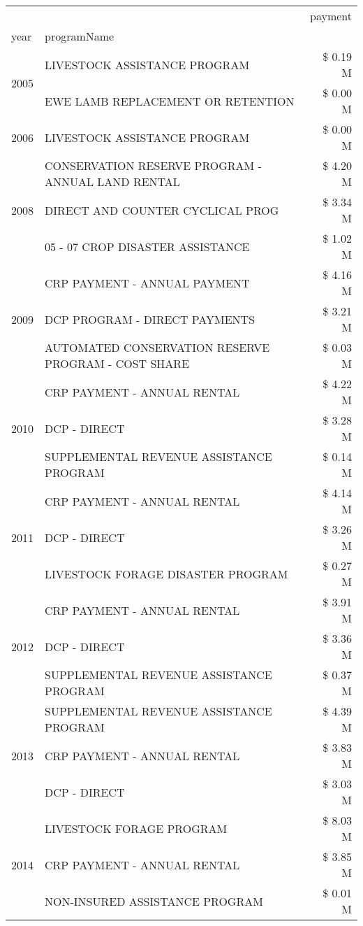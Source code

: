 \begin{tabular}{llr}
\toprule
 &  & payment \\
year & programName &  \\
\midrule
\multirow[t]{2}{*}{2005} & LIVESTOCK ASSISTANCE PROGRAM & \$ 0.19 M \\
 & EWE LAMB REPLACEMENT OR RETENTION & \$ 0.00 M \\
\cline{1-3}
2006 & LIVESTOCK ASSISTANCE PROGRAM & \$ 0.00 M \\
\cline{1-3}
\multirow[t]{3}{*}{2008} & CONSERVATION RESERVE PROGRAM - ANNUAL LAND RENTAL & \$ 4.20 M \\
 & DIRECT AND COUNTER CYCLICAL PROG & \$ 3.34 M \\
 & 05 - 07 CROP DISASTER ASSISTANCE & \$ 1.02 M \\
\cline{1-3}
\multirow[t]{3}{*}{2009} & CRP PAYMENT - ANNUAL PAYMENT & \$ 4.16 M \\
 & DCP PROGRAM - DIRECT PAYMENTS & \$ 3.21 M \\
 & AUTOMATED CONSERVATION RESERVE PROGRAM - COST SHARE & \$ 0.03 M \\
\cline{1-3}
\multirow[t]{3}{*}{2010} & CRP PAYMENT - ANNUAL RENTAL & \$ 4.22 M \\
 & DCP - DIRECT & \$ 3.28 M \\
 & SUPPLEMENTAL REVENUE ASSISTANCE PROGRAM & \$ 0.14 M \\
\cline{1-3}
\multirow[t]{3}{*}{2011} & CRP PAYMENT - ANNUAL RENTAL & \$ 4.14 M \\
 & DCP - DIRECT & \$ 3.26 M \\
 & LIVESTOCK FORAGE DISASTER PROGRAM & \$ 0.27 M \\
\cline{1-3}
\multirow[t]{3}{*}{2012} & CRP PAYMENT - ANNUAL RENTAL & \$ 3.91 M \\
 & DCP - DIRECT & \$ 3.36 M \\
 & SUPPLEMENTAL REVENUE ASSISTANCE PROGRAM & \$ 0.37 M \\
\cline{1-3}
\multirow[t]{3}{*}{2013} & SUPPLEMENTAL REVENUE ASSISTANCE PROGRAM & \$ 4.39 M \\
 & CRP PAYMENT - ANNUAL RENTAL & \$ 3.83 M \\
 & DCP - DIRECT & \$ 3.03 M \\
\cline{1-3}
\multirow[t]{3}{*}{2014} & LIVESTOCK FORAGE PROGRAM & \$ 8.03 M \\
 & CRP PAYMENT - ANNUAL RENTAL & \$ 3.85 M \\
 & NON-INSURED ASSISTANCE PROGRAM & \$ 0.01 M \\

\end{tabular}
